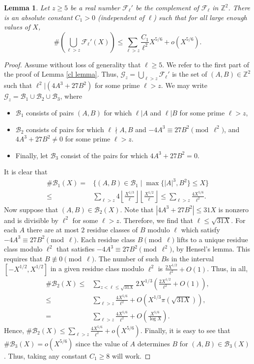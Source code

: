 \documentclass[12pt]{amsart}
\newtheorem{lemma}[theorem]{Lemma}
\newcommand{\cF}{\mathcal{F}}
\newcommand{\cG}{\mathcal{G}}
\newcommand{\Z}{\mathbb{Z}}
\newcommand{\op}[1]{\operatorname{#1}}
\numberwithin{equation}{section}
\begin{document}
\begin{lemma}\label{C_1 tech lemma}
    Let $z\geq 5$ be a real number $\cF_\ell'$ be the complement of $\cF_\ell$ in $\Z^2$. There is an absolute constant $C_1>0$ (independent of $\ell$) such that for all large enough values of $X$,
    \[\# \left(\bigcup_{\ell> z}\cF_\ell'(X)\right)\leq \sum_{\ell>z}\frac{C_1}{\ell^2} X^{5/6}+o(X^{5/6}).\] 
\end{lemma}
\begin{proof}
Assume without loss of generality that $\ell\geq 5$. We refer to the first part of the proof of Lemma \ref{cl lemma}. Thus, $\cG_z=\bigcup_{\ell>z}\cF_\ell'$ is the set of $(A,B)\in \Z^2$ such that $\ell^2|(4A^3+27B^2)$ for some prime $\ell>z$. We may write $\cG_z=\mathcal{B}_1\cup \mathcal{B}_2\cup \mathcal{B}_3$, where 
\begin{itemize}
    \item $\mathcal{B}_1$ consists of pairs $(A,B)$ for which $\ell|A$ and $\ell|B$ for some prime $\ell>z$, 
    \item $\mathcal{B}_2$ consists of pairs for which $\ell\nmid A, B$ and $-4A^3\equiv 27B^2\pmod{\ell^2}$, and $4A^3+27B^2\neq 0$ for some prime $\ell>z$.
    \item Finally, let $\mathcal{B}_3$ consist of the pairs for which $4A^3+27B^2=0$. 
\end{itemize}

It is clear that \[\begin{split}\# \mathcal{B}_1(X) = & \{(A,B)\in \mathcal{B}_1\mid \op{max}\{|A|^3, B^2\}\leq X\} \\ 
\leq & \sum_{\ell>z} 4 \left\lfloor \frac{X^{1/3}}{\ell}\right \rfloor \left\lfloor \frac{X^{1/2}}{\ell}\right\rfloor \leq \sum_{\ell>z} \frac{4X^{5/6}}{\ell^2}.\end{split}\] Now suppose that $(A,B)\in \mathcal{B}_2(X)$. Note that $|4A^3+27B^2|\leq 31 X$ is nonzero and is divisible by $\ell^2$ for some $\ell>z$. Therefore, we find that $\ell\leq \sqrt{31 X}$. For each $A$ there are at most $2$ residue classes of $B$ modulo $\ell$ which satisfy $-4A^3\equiv 27B^2\pmod{\ell}$. Each residue class $B\pmod{\ell}$ lifts to a unique residue class modulo $\ell^2$ that satisfies $-4A^3\equiv 27B^2\pmod{\ell^2}$, by Hensel's lemma. This requires that $B\not\equiv 0\pmod{\ell}$. The number of such $B$s in the interval $[-X^{1/2}, X^{1/2}]$ in a given residue class modulo $\ell^2$ is $\frac{2 X^{1/2}}{\ell^2}+O(1)$. Thus, in all, \[\begin{split}\#\mathcal{B}_2(X)\leq & \sum_{z<\ell\leq \sqrt{31 X}} 2X^{1/3} \left(\frac{2 X^{1/2}}{\ell^2}+O(1)\right),\\
\leq & \sum_{\ell>z} \frac{4 X^{5/6}}{\ell^2}+O\left(X^{1/3}\pi(\sqrt{31 X})\right),\\
= & \sum_{\ell>z} \frac{4 X^{5/6}}{\ell^2} +O\left(\frac{X^{5/6}}{\log X}\right).
\end{split}\] Hence, $\# \mathcal{B}_2(X)\leq \sum_{\ell>z} \frac{4 X^{5/6}}{\ell^2} +o\left(X^{5/6}\right)$. Finally, it is easy to see that $\# \mathcal{B}_3(X)=o(X^{5/6})$ since the value of $A$ determines $B$ for $(A,B)\in \mathcal{B}_3(X)$. Thus, taking any constant $C_1\geq 8$ will work. 
\end{proof}
\end{document}
